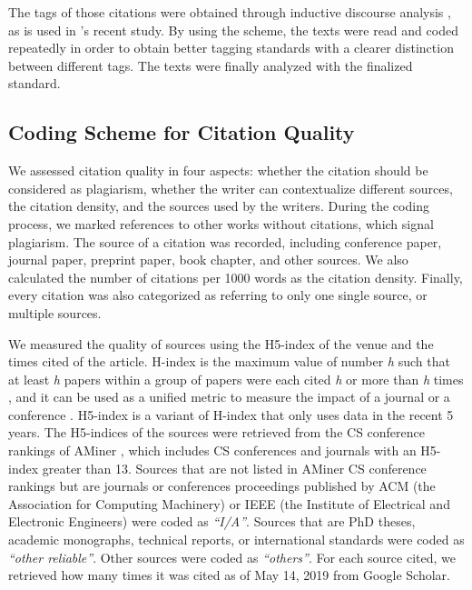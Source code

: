 The tags of those citations were obtained through inductive discourse analysis \citep{thomas_general_2006}, as is used in \citeauthor{samraj_form_2013}'s \citeyearpar{samraj_form_2013} recent study. By using the scheme, the texts were read and coded repeatedly in order to obtain better tagging standards with a clearer distinction between different tags. The texts were finally analyzed with the finalized standard.

\subsection{Coding Scheme for Citation Quality}
We assessed citation quality in four aspects: whether the citation should be considered as plagiarism, whether the writer can contextualize different sources, the citation density, and the sources used by the writers. During the coding process, we marked references to other works without citations, which signal plagiarism. The source of a citation was recorded, including conference paper, journal paper, preprint paper, book chapter, and other sources. We also calculated the number of citations per 1000 words as the citation density. Finally, every citation was also categorized as referring to only one single source, or multiple sources.

We measured the quality of sources using the H5-index of the venue and the times cited of the article. H-index is the maximum value of number \textit{h} such that at least \textit{h} papers within a group of papers were each cited \textit{h} or more than \textit{h} times \citep{hirsch_index_2005}, and it can be used as a unified metric to measure the impact of a journal or a conference \citep{braun_hirsch-type_2006}. H5-index is a variant of H-index that only uses data in the recent 5 years. The H5-indices of the sources were retrieved from the CS conference rankings of AMiner \citep{tang_arnetminer:_2008}, which includes CS conferences and journals with an H5-index greater than 13. Sources that are not listed in AMiner CS conference rankings but are journals or conferences proceedings published by ACM (the Association for Computing Machinery) or IEEE (the Institute of Electrical and Electronic Engineers) were coded as \textit{“I/A”}. Sources that are PhD theses, academic monographs, technical reports, or international standards were coded as \textit{“other reliable”}. Other sources were coded as \textit{“others”}. For each source cited, we retrieved how many times it was cited as of May 14, 2019 from Google Scholar.

